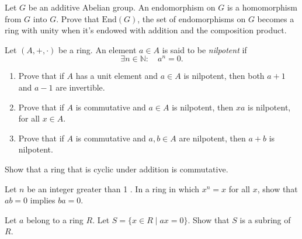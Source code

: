 \documentclass[
    11pt,a4paper,
]{exam}
\begin{document}
\begin{questions}


\question
Let $G$ be an additive Abelian group. An endomorphism on $G$ is a homomorphism from $G$ into $G$. Prove that $\mathrm{End}(G)$, the set of endomorphisms on $G$ becomes a ring with unity when it's endowed with addition and the composition product.


\question
Let $(A,+,\cdot)$ be a ring. An element $a\in A$ is said to be \emph{nilpotent} if
$$
\exists n\in \mathbb{N}:\quad a^n = 0.
$$
\begin{enumerate}[label=(\roman*)]
\item Prove that if $A$ has a unit element and $a\in A$ is nilpotent, then both $a+1$ and $a-1$ are invertible.
\item Prove that if $A$ is commutative and $a\in A$ is nilpotent, then $xa$ is nilpotent, for all $x\in A$.
\item Prove that if $A$ is commutative and $a,b\in A$  are nilpotent, then $a+b$ is nilpotent.
\end{enumerate}

\question
Show that a ring that is cyclic under addition is commutative. 


\question
Let $n$ be an integer greater than 1 . In a ring in which $x^n=x$ for all $x$, show that $a b=0$ implies $b a=0$.

\question
Let $a$ belong to a ring $R$. Let $S=\{x \in R \mid a x=0\}$. Show that $S$ is a subring of $R$.


\end{questions}
\end{document}

